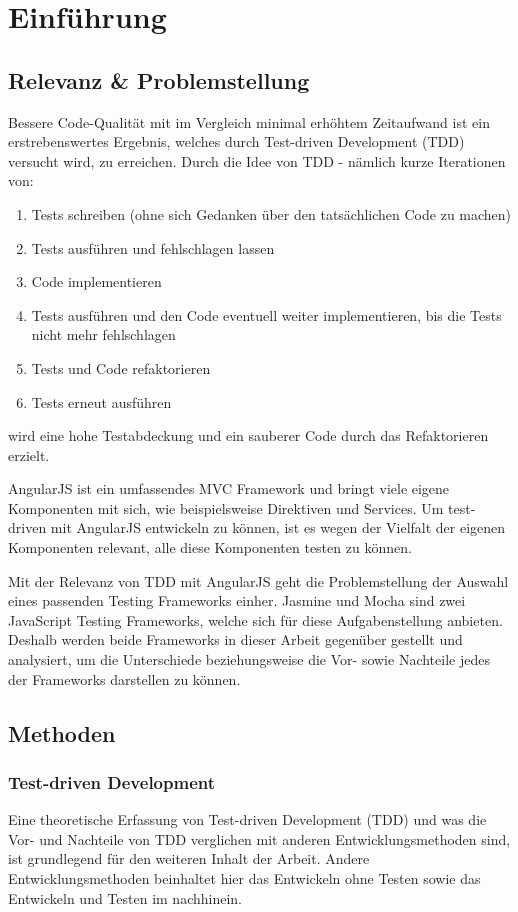 
\section{Einführung}
\label{Einführung}
\subsection{Relevanz \& Problemstellung}
Bessere Code-Qualität mit im Vergleich minimal erhöhtem Zeitaufwand ist ein
erstrebenswertes Ergebnis, welches durch Test-driven Development (TDD) versucht
wird, zu erreichen. Durch die Idee von TDD - nämlich kurze Iterationen von:
\begin{enumerate}
  \item Tests schreiben (ohne sich Gedanken über den tatsächlichen Code zu machen)
  \item Tests ausführen und fehlschlagen lassen
  \item Code implementieren
  \item Tests ausführen und den Code eventuell weiter implementieren, bis die 
  Tests nicht mehr fehlschlagen
  \item Tests und Code refaktorieren
  \item Tests erneut ausführen
\end{enumerate}
wird eine hohe Testabdeckung und ein sauberer Code durch das Refaktorieren 
erzielt.

AngularJS ist ein umfassendes MVC Framework und bringt viele eigene Komponenten
mit sich, wie beispielsweise Direktiven und Services. Um test-driven mit 
AngularJS entwickeln zu können, ist es wegen der Vielfalt der eigenen 
Komponenten relevant, alle diese Komponenten testen zu können.

Mit der Relevanz von TDD mit AngularJS geht die Problemstellung der Auswahl 
eines passenden Testing Frameworks einher. Jasmine und Mocha sind zwei 
JavaScript Testing Frameworks, welche sich für diese Aufgabenstellung anbieten. 
Deshalb werden beide Frameworks in dieser Arbeit gegenüber gestellt und 
analysiert, um die Unterschiede beziehungsweise die Vor- sowie Nachteile jedes der 
Frameworks darstellen zu können.

\subsection{Methoden}
\subsubsection{Test-driven Development}
Eine theoretische Erfassung von Test-driven Development (TDD) und was die
Vor- und Nachteile von TDD verglichen mit anderen Entwicklungsmethoden sind, 
ist grundlegend für den weiteren Inhalt der Arbeit. Andere Entwicklungsmethoden
beinhaltet hier das Entwickeln ohne Testen sowie das Entwickeln und Testen im
nachhinein.

